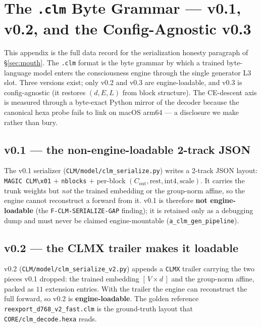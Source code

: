 \section{The \texttt{.clm} Byte Grammar --- v0.1, v0.2, and the Config-Agnostic v0.3}
\label{app:clm_serialization}

This appendix is the full data record for the serialization honesty paragraph of
\S\ref{sec:mouth}. The \texttt{.clm} format is the byte grammar by which a trained
byte-language model enters the consciousness engine through the single generator
L3 slot. Three versions exist; only v0.2 and v0.3 are engine-loadable, and v0.3
is config-agnostic (it restores $(d,E,L)$ from block structure). The CE-descent
axis is measured through a byte-exact Python mirror of the decoder because the
canonical hexa probe fails to link on macOS arm64 --- a disclosure we make rather
than bury.

\subsection{v0.1 --- the non-engine-loadable 2-track JSON}
\label{app:clm-v01}

The v0.1 serializer (\texttt{CLM/model/clm\_serialize.py}) writes a 2-track JSON
layout: \texttt{MAGIC CLM\textbackslash x01} $+$ \texttt{nblocks} $+$ per-block
$(C_\text{out},\text{rest},\text{int4},\text{scale})$. It carries the trunk
weights but \emph{not} the trained embedding or the group-norm affine, so the
engine cannot reconstruct a forward from it. v0.1 is therefore \textbf{not
engine-loadable} (the \texttt{F-CLM-SERIALIZE-GAP} finding); it is retained only
as a debugging dump and must never be claimed engine-mountable
(\texttt{a\_clm\_gen\_pipeline}).

\subsection{v0.2 --- the CLMX trailer makes it loadable}
\label{app:clm-v02}

v0.2 (\texttt{CLM/model/clm\_serialize\_v2.py}) appends a \texttt{CLMX} trailer
carrying the two pieces v0.1 dropped: the trained embedding $[\,V\!\times\!d\,]$
and the group-norm affine, packed as $11$ extension entries. With the trailer the
engine can reconstruct the full forward, so v0.2 is \textbf{engine-loadable}. The
golden reference \texttt{reexport\_d768\_v2\_fast.clm} is the ground-truth layout
that \texttt{CORE/clm\_decode.hexa} reads.

